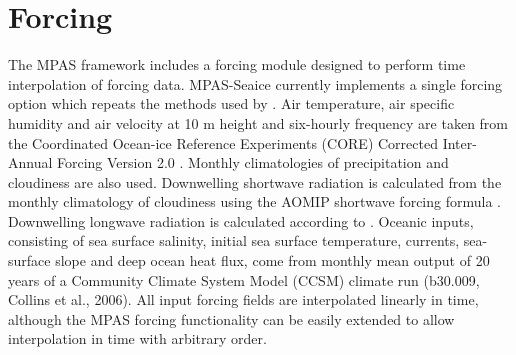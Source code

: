 \section{Forcing}
\label{sec:forcing}

The MPAS framework includes a forcing module designed to perform time interpolation of forcing data. MPAS-Seaice currently implements a single forcing option which repeats the methods used by \citet{Hunke13}. Air temperature, air specific humidity and air velocity at 10 m height and six-hourly frequency are taken from the Coordinated Ocean-ice Reference Experiments (CORE) Corrected Inter-Annual Forcing Version 2.0 \citep{Large09, Griffies09}. Monthly climatologies of precipitation \citep{Griffies09} and cloudiness \citep{Roske01} are also used. Downwelling shortwave radiation is calculated from the monthly climatology of cloudiness using the AOMIP shortwave forcing formula \citep{Hunke15}. Downwelling longwave radiation is calculated according to \citet{Rosati88}. Oceanic inputs, consisting of sea surface salinity, initial sea surface temperature, currents, sea-surface slope and deep ocean heat flux, come from monthly mean output of 20 years of a Community Climate System Model (CCSM) climate run (b30.009, Collins et al., 2006). All input forcing fields are interpolated linearly in time, although the MPAS forcing functionality can be easily extended to allow interpolation in time with arbitrary order.